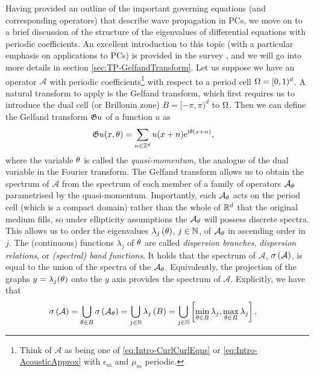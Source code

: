 Having provided an outline of the important governing equations (and corresponding operators) that describe wave propagation in PCs, we move on to a brief discussion of the structure of the eigenvalues of differential equations with periodic coefficients.
An excellent introduction to this topic (with a particular emphasis on applications to PCs) is provided in the survey \cite{kuchment2001mathematics}, and we will go into more details in section \ref{sec:TP-GelfandTransform}.
Let us suppose we have an operator $\mathcal{A}$ with periodic coefficients\footnote{Think of $\mathcal{A}$ as being one of \eqref{eq:Intro-CurlCurlEqns} or \eqref{eq:Intro-AcousticApprox} with $\epsilon_m$ and $\mu_m$ periodic.} with respect to a period cell $\Omega=[0,1)^d$.
A natural transform to apply is the Gelfand transform, which first requires us to introduce the dual cell (or Brillouin zone) $B=[-\pi,\pi)^d$ to $\Omega$.
Then we can define the Gelfand transform $\mathfrak{G} u$ of a function $u$ as 
\begin{align*}
	\mathfrak{G} u(x, \theta) &= \sum_{n\in\mathbb{Z}^d} u(x+n)\mathrm{e}^{\mathrm{i}\theta(x+n)},
\end{align*}
where the variable $\theta$ is called the \emph{quasi-momentum}, the analogue of the dual variable in the Fourier transform.
The Gelfand transform allows us to obtain the spectrum of $\mathcal{A}$ from the spectrum of each member of a family of operators $\mathcal{A}_{\theta}$ parametrised by the quasi-momentum.
Importantly, each $\mathcal{A}_{\theta}$ acts on the period cell (which is a compact domain) rather than the whole of $\mathbb{R}^d$ that the original medium fills, so under ellipticity assumptions the $\mathcal{A}_{\theta}$ will possess discrete spectra.
This allows us to order the eigenvalues $\lambda_j\left( \theta \right)$, $j\in\mathbb{N}$, of $\mathcal{A}_{\theta}$ in ascending order in $j$.
The (continuous) functions $\lambda_j$ of $\theta$ are called \emph{dispersion branches}, \emph{dispersion relations}, or \emph{(spectral) band functions}.
It holds that the spectrum of $\mathcal{A}$, $\sigma\left( \mathcal{A} \right)$, is equal to the union of the spectra of the $\mathcal{A}_\theta$.
Equivalently, the projection of the graphs $y=\lambda_j(\theta)$ onto the $y$ axis provides the spectrum of $\mathcal{A}$.
Explicitly, we have that
\begin{align*}
	\sigma\left( \mathcal{A} \right) &= \bigcup_{\theta\in B} \sigma\left( \mathcal{A}_{\theta} \right)
	= \bigcup_{j\in\mathbb{N}} \lambda_j\left( B \right)
	= \bigcup_{j\in\mathbb{N}} \left[  \min_{\theta\in B}\lambda_j, \max_{\theta\in B}\lambda_j  \right],
\end{align*}
